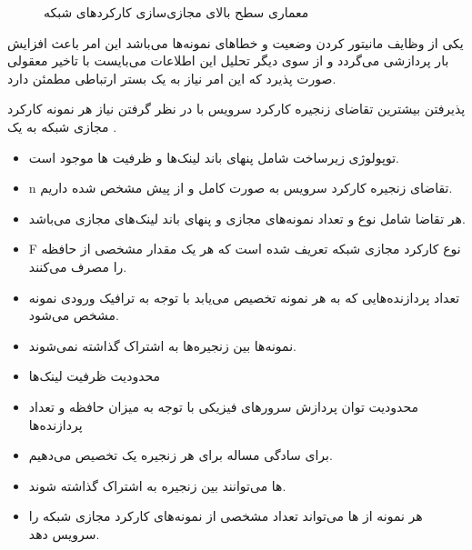 \documentclass{beamer}
\makeatletter
\newcommand{\RTList}{\raggedleft\rightskip\@totalleftmargin}
\makeatother
\begin{document}
\begin{persian}
\begin{frame}
\begin{center}
\begin{figure}
		\caption{معماری سطح بالای مجازی‌سازی کارکردهای شبکه}
	\end{figure}\end{center}
\end{frame}
\begin{frame}
	\par
	یکی از وظایف  مانیتور کردن وضعیت و خطاهای نمونه‌ها می‌باشد
	این امر باعث افزایش بار پردازشی  می‌گردد
	و از سوی دیگر تحلیل این اطلاعات می‌بایست با تاخیر معقولی صورت پذیرد که این امر
	نیاز به یک بستر ارتباطی مطمئن دارد.
\end{frame}
\begin{frame}
	\par
	پذیرفتن بیشترین تقاضای زنجیره‌ کارکرد سرویس با در نظر گرفتن نیاز هر نمونه کارکرد مجازی شبکه به یک .
\end{frame}
\begin{frame}
	\begin{itemize}\RTList
		\item توپولوژی زیرساخت شامل پنهای باند لینک‌ها و ظرفیت ها موجود است.
		\item n تقاضای زنجیره‌ کارکرد سرویس به صورت کامل و از پیش مشخص شده داریم.
		\item هر تقاضا شامل نوع و تعداد نمونه‌های مجازی و پنهای باند لینک‌های مجازی می‌باشد.
		\item F نوع کارکرد مجازی شبکه تعریف شده است که هر یک مقدار مشخصی از حافظه را مصرف می‌کنند.
		\item تعداد پردازنده‌هایی که به هر نمونه تخصیص می‌یابد با توجه به ترافیک ورودی نمونه مشخص می‌شود.
		\item نمونه‌ها بین زنجیره‌ها به اشتراک گذاشته نمی‌شوند.
	\end{itemize}
\end{frame}
\begin{frame}
	\begin{itemize}\RTList
		\item محدودیت ظرفیت لینک‌ها
		\item محدودیت توان پردازش سرورهای فیزیکی با توجه به میزان حافظه و تعداد پردازنده‌ها
	\end{itemize}
\end{frame}
\begin{frame}
	\begin{itemize}\RTList
		\item برای سادگی مساله برای هر زنجیره یک  تخصیص می‌دهیم.
		\item {}ها می‌توانند بین زنجیره به اشتراک گذاشته شوند.
		\item هر نمونه از ها می‌تواند تعداد مشخصی از نمونه‌های کارکرد مجازی شبکه را سرویس دهد. 

\end{itemize}
\end{frame}
\end{persian}
\end{document}
